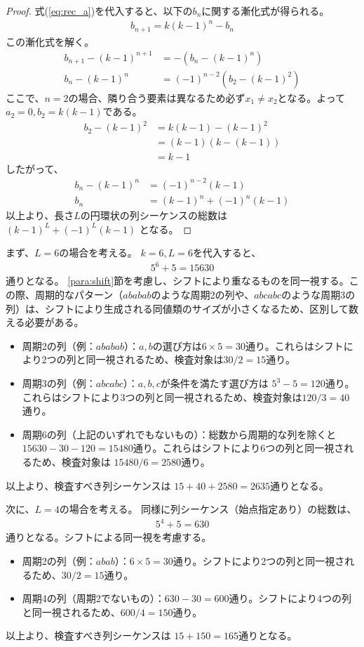 \documentclass[a4paper,11pt,dvipdfmx]{jsarticle}
\theoremstyle{definition}
\begin{document}
\begin{proof}
  式(\ref{eq:rec_a})を代入すると、以下の$b_n$に関する漸化式が得られる。
  \begin{align}
    b_{n+1} = k(k-1)^n - b_n
  \end{align}
  この漸化式を解く。
  \begin{align}
    b_{n+1} - (k-1)^{n+1} &= -(b_n - (k-1)^n) \\
    b_n - (k-1)^n &= (-1)^{n-2} (b_2 - (k-1)^2)
  \end{align}
  ここで、$n=2$の場合、隣り合う要素は異なるため必ず$x_1 \neq x_2$となる。よって$a_2 = 0, b_2 = k(k-1)$である。
  \begin{align}
    b_2 - (k-1)^2 &= k(k-1) - (k-1)^2 \\
    &= (k-1)(k - (k-1)) \\
    &= k-1
  \end{align}
  したがって、
  \begin{align}
    b_n - (k-1)^n &= (-1)^{n-2}(k-1) \\
    b_n &= (k-1)^n + (-1)^n(k-1)
  \end{align}
  以上より、長さ$L$の円環状の列シーケンスの総数は $(k-1)^L + (-1)^L(k-1)$ となる。
\end{proof}
まず、$L=6$の場合を考える。
$k=6, L=6$を代入すると、
  \begin{align}
    5^6 + 5 = 15630
  \end{align}
  通りとなる。
\ref{para:shift}節を考慮し、シフトにより重なるものを同一視する。この際、周期的なパターン（$ababab$のような周期2の列や、$abcabc$のような周期3の列）は、シフトにより生成される同値類のサイズが小さくなるため、区別して数える必要がある。
\begin{itemize}
  \item 周期2の列（例：$ababab$）：$a,b$の選び方は$6 \times 5 = 30$通り。これらはシフトにより2つの列と同一視されるため、検査対象は$30/2 = 15$通り。
  \item 周期3の列（例：$abcabc$）：$a,b,c$が条件を満たす選び方は $5^3 - 5 = 120$通り。これらはシフトにより3つの列と同一視されるため、検査対象は$120/3 = 40$通り。
  \item 周期6の列（上記のいずれでもないもの）：総数から周期的な列を除くと $15630 - 30 - 120 = 15480$通り。これらはシフトにより6つの列と同一視されるため、検査対象は $15480/6 = 2580$通り。
\end{itemize}
以上より、検査すべき列シーケンスは $15 + 40 + 2580 = 2635$通りとなる。

次に、$L=4$の場合を考える。
同様に列シーケンス（始点指定あり）の総数は、
\begin{align}
  5^4 + 5 = 630
\end{align}
通りとなる。シフトによる同一視を考慮する。
\begin{itemize}
  \item 周期2の列（例：$abab$）：$6 \times 5 = 30$通り。シフトにより2つの列と同一視されるため、$30/2 = 15$通り。
  \item 周期4の列（周期2でないもの）：$630 - 30 = 600$通り。シフトにより4つの列と同一視されるため、$600/4 = 150$通り。
\end{itemize}
以上より、検査すべき列シーケンスは $15 + 150 = 165$通りとなる。
\end{document}
